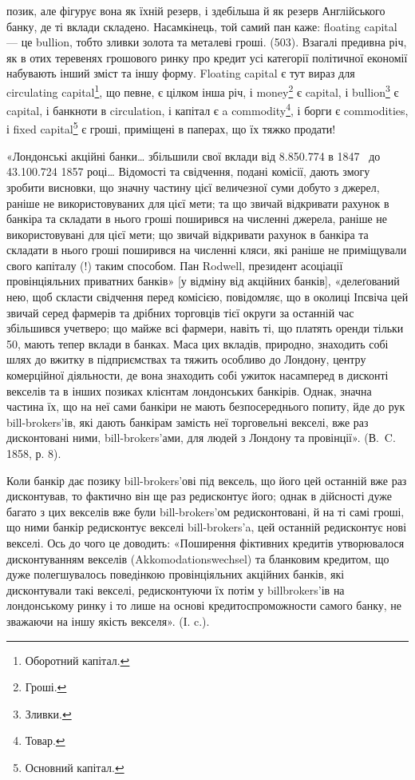\parcont{}  %
позик, але фігурує вона як їхній резерв, і здебільша й як резерв Англійського
банку, де ті вклади складено. Насамкінець, той самий пан каже: floating
capital — це bullion, тобто зливки золота та металеві гроші. (503). Взагалі предивна
річ, як в отих теревенях грошового ринку про кредит усі категорії політичної
економії набувають інший зміст та іншу форму. Floating capital є тут
вираз для circulating capital\footnote*{
Оборотний капітал. 
}, що певне, є цілком інша річ, і money\footnote*{
Гроші. 
} є capital,
і bullion\footnote*{
Зливки. 
} є capital, і банкноти в circulation, і капітал є a commodity\footnote*{
Товар. 
}, і борги є
commodities, і fixed capital\footnote*{
Основний капітал. 
} є гроші, приміщені в паперах, що їх тяжко продати!

«Лондонські акційні банки\dots{} збільшили свої вклади від \num{8.850.774}
в 1847~ до \num{43.100.724} 1857 році\dots{} Відомості та свідчення, подані
комісії, дають змогу зробити висновки, що значну частину цієї величезної суми
добуто з джерел, раніше не використовуваних для цієї мети; та що звичай відкривати
рахунок в банкіра та складати в нього гроші поширився на численні
джерела, раніше не використовувані для цієї мети; що звичай відкривати рахунок
в банкіра та складати в нього гроші поширився на численні кляси, які
раніше не приміщували свого капіталу (!) таким способом. Пан Rodwell, президент
асоціації провінціяльних приватних банків» [у відміну від акційних
банків], «делеґований нею, щоб скласти свідчення перед комісією, повідомляє,
що в околиці Іпсвіча цей звичай серед фармерів та дрібних торговців тієї
округи за останній час збільшився учетверо; що майже всі фармери, навіть ті,
що платять оренди тільки 50, мають тепер вклади в банках. Маса
цих вкладів, природно, знаходить собі шлях до вжитку в підприємствах та
тяжить особливо до Лондону, центру комерційної діяльности, де вона знаходить
собі ужиток насамперед в дисконті векселів та в інших позиках клієнтам лондонських
банкірів. Однак, значна частина їх, що на неї сами банкіри не мають
безпосереднього попиту, йде до рук bill-brokers’ів, які дають банкірам замість
неї торговельні векселі, вже раз дисконтовані ними, bill-brokers’ами, для людей
з Лондону та провінції». (В.~C. 1858, р. 8).

Коли банкір дає позику bill-brokers’ові під вексель, що його цей останній
вже раз дисконтував, то фактично він ще раз редисконтує його; однак в дійсності
дуже багато з цих векселів вже були bill-brokers’ом редисконтовані, й на
ті самі гроші, що ними банкір редисконтує векселі bill-brokers’a, цей останній
редисконтує нові векселі. Ось до чого це доводить: «Поширення фіктивних кредитів
утворювалося дисконтуванням векселів (Akkomodationswechsel) та бланковим
кредитом, що дуже полегшувалось поведінкою провінціяльних акційних банків,
які дисконтували такі векселі, редисконтуючи їх потім у billbrokers’ів на лондонському
ринку і то лише на основі кредитоспроможности самого банку, не
зважаючи на іншу якість векселя». (І. c.).

